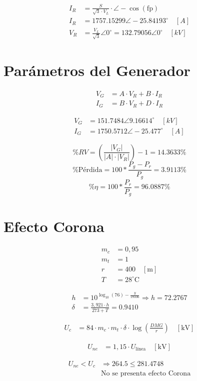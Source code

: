 \begin{align*}
I_R &= \frac{S}{\sqrt{3} \cdot V_L} \cdot \angle -\cos(\text{fp})  \\
I_R &= 1757.15299 \angle  -25.84193 ^\circ \quad [A] \\
V_R &= \frac{V_L}{\sqrt{3}} \angle 0^\circ = 132.79056 \angle 0^\circ \quad [kV]
\end{align*}

\section*{Parámetros del Generador}

\begin{align*}
V_G &= A \cdot V_R + B \cdot I_R \\
I_G &= B \cdot V_R + D \cdot I_R
\end{align*}

\begin{align*}
V_G &= 151.7484 \angle 9.16614^\circ \quad [kV] \\
I_G &= 1750.5712 \angle -25.477^\circ \quad [A]
\end{align*}

\[
\%RV = \left( \frac{ |V_G| }{ |A| \cdot |V_R| } \right) - 1 = 14.3633\%
\]
\[
\% \text{Pérdida} = 100*\frac{P_g - P_r}{P_g} =  3.9113\%
\]
\[
\% \eta =100* \frac{P_r}{P_g} = 96.0887\%
\]

\section*{Efecto Corona}

\begin{align*}
m_c &= 0{,}95 \\
m_t &= 1 \\
r &= 400 \quad [\text{m}] \\
T &= 28^\circ \text{C}
\end{align*}

\begin{align*}
h &= 10^{\log_{10}(76) - \frac{y}{18336}} \Rightarrow h = 72.2767 \\
\delta &= \frac{3{,}921 \cdot h}{273 + T} = 0.9410
\end{align*}

\begin{align*}
U_c &= 84 \cdot m_c \cdot m_t \cdot \delta \cdot \log \left( \frac{DMG}{r} \right) \quad [\text{kV}]
\end{align*}

\begin{align*}
U_{ne} &= 1{,}15 \cdot U_{\text{línea}} \quad [\text{kV}]
\end{align*}

\begin{align*}
U_{ne} < U_c &\Rightarrow 264.5 \leq 281.4748 \\
&\text{No se presenta efecto Corona}
\end{align*}